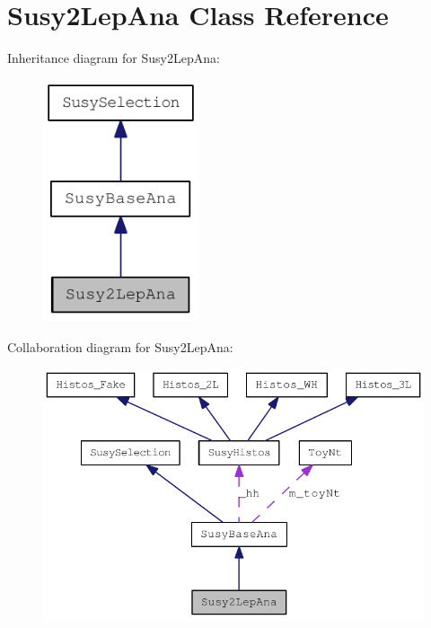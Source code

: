 \hypertarget{classSusy2LepAna}{
\section{Susy2LepAna Class Reference}
\label{classSusy2LepAna}
}
Inheritance diagram for Susy2LepAna:\nopagebreak
\begin{figure}[H]
\begin{center}
\leavevmode
\includegraphics[width=130pt]{classSusy2LepAna__inherit__graph}
\end{center}
\end{figure}
Collaboration diagram for Susy2LepAna:\nopagebreak
\begin{figure}[H]
\begin{center}
\leavevmode
\includegraphics[width=372pt]{classSusy2LepAna__coll__graph}
\end{center}
\end{figure}
